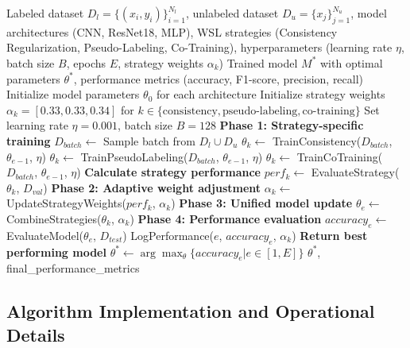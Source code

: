 \documentclass{ieeeaccess}
\begin{document}
\begin{algorithmic}[1]
\REQUIRE Labeled dataset $D_l = \{(x_i, y_i)\}_{i=1}^{N_l}$, unlabeled dataset $D_u = \{x_j\}_{j=1}^{N_u}$, model architectures (CNN, ResNet18, MLP), WSL strategies (Consistency Regularization, Pseudo-Labeling, Co-Training), hyperparameters (learning rate $\eta$, batch size $B$, epochs $E$, strategy weights $\alpha_k$)
\ENSURE Trained model $M^*$ with optimal parameters $\theta^*$, performance metrics (accuracy, F1-score, precision, recall)
\STATE Initialize model parameters $\theta_0$ for each architecture
\STATE Initialize strategy weights $\alpha_k = [0.33, 0.33, 0.34]$ for $k \in \{\text{consistency}, \text{pseudo-labeling}, \text{co-training}\}$
\STATE Set learning rate $\eta = 0.001$, batch size $B = 128$
    \STATE \textbf{Phase 1: Strategy-specific training}
        \STATE $D_{batch} \leftarrow$ Sample batch from $D_l \cup D_u$
            \STATE $\theta_k \leftarrow$ TrainConsistency($D_{batch}$, $\theta_{e-1}$, $\eta$)
            \STATE $\theta_k \leftarrow$ TrainPseudoLabeling($D_{batch}$, $\theta_{e-1}$, $\eta$)
            \STATE $\theta_k \leftarrow$ TrainCoTraining($D_{batch}$, $\theta_{e-1}$, $\eta$)
        \ENDIF
        \STATE \textbf{Calculate strategy performance}
        \STATE $perf_k \leftarrow$ EvaluateStrategy($\theta_k$, $D_{val}$)
    \ENDFOR
    \STATE \textbf{Phase 2: Adaptive weight adjustment}
    \STATE $\alpha_k \leftarrow$ UpdateStrategyWeights($perf_k$, $\alpha_k$)
    \STATE \textbf{Phase 3: Unified model update}
    \STATE $\theta_e \leftarrow$ CombineStrategies($\theta_k$, $\alpha_k$)
    \STATE \textbf{Phase 4: Performance evaluation}
        \STATE $accuracy_e \leftarrow$ EvaluateModel($\theta_e$, $D_{test}$)
        \STATE LogPerformance($e$, $accuracy_e$, $\alpha_k$)
    \ENDIF
\ENDFOR
\STATE \textbf{Return best performing model}
\STATE $\theta^* \leftarrow \arg\max_\theta \{accuracy_e | e \in [1, E]\}$
\RETURN $\theta^*$, final\_performance\_metrics
\end{algorithmic}

\subsection{Algorithm Implementation and Operational Details}
\end{document}
